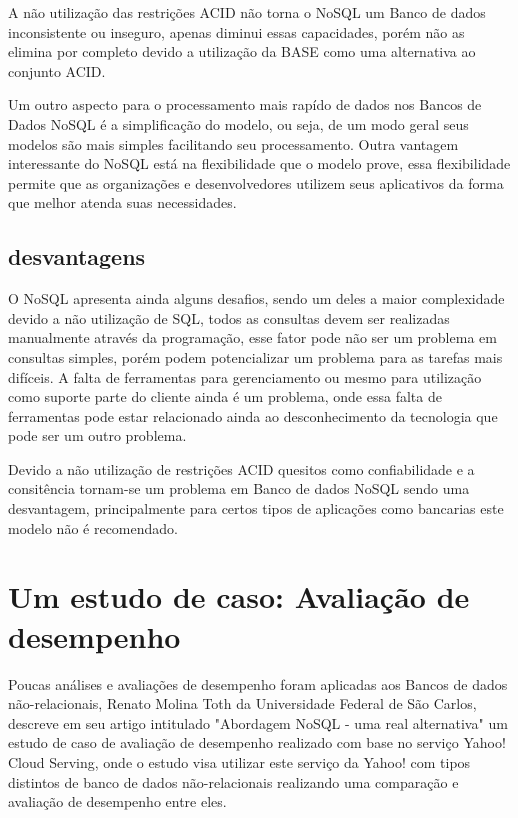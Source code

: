 \documentclass[12pt]{article}
\begin{document}
A não utilização das restrições ACID não torna o NoSQL um Banco de dados inconsistente ou inseguro, apenas diminui essas capacidades, porém não as elimina por completo devido a utilização da BASE como uma alternativa ao conjunto ACID.\cite{pritchett:2008}

Um outro aspecto para o processamento mais rapído de dados nos Bancos de Dados NoSQL é a simplificação do modelo, ou seja, de um modo geral seus modelos são mais simples facilitando seu processamento. Outra vantagem interessante do NoSQL está na flexibilidade que o modelo prove, essa flexibilidade permite que as organizações e desenvolvedores utilizem seus aplicativos da forma que melhor atenda suas necessidades.\cite{leavitt:2010}

\subsection{desvantagens}
\label{subsec:desvantagens}

O NoSQL apresenta ainda alguns desafios, sendo um deles a maior complexidade devido a não utilização de SQL, todos as consultas devem ser realizadas manualmente através da programação, esse fator pode não ser um problema em consultas simples, porém podem potencializar um problema para as tarefas mais difíceis. A falta de ferramentas para gerenciamento ou mesmo para utilização como suporte parte do cliente ainda é um problema, onde essa falta de ferramentas pode estar relacionado ainda ao desconhecimento da tecnologia que pode ser um outro problema.\cite{leavitt:2010}

Devido a não utilização de restrições ACID quesitos como confiabilidade e a consitência tornam-se um problema em Banco de dados NoSQL sendo uma desvantagem, principalmente para certos tipos de aplicações como bancarias este modelo não é recomendado.\cite{leavitt:2010}

\section{Um estudo de caso: Avaliação de desempenho}
\label{sec:estudoDeCaso}

Poucas análises e avaliações de desempenho foram aplicadas aos Bancos de dados não-relacionais, Renato Molina Toth da Universidade Federal de São Carlos, descreve em seu artigo intitulado "Abordagem NoSQL - uma real alternativa" \cite{toth2011abordagem} um estudo de caso de avaliação de desempenho realizado com base no serviço Yahoo! Cloud Serving, onde o estudo visa utilizar este serviço da Yahoo! com tipos distintos de banco de dados não-relacionais realizando uma comparação e avaliação de desempenho entre eles.
\end{document}
